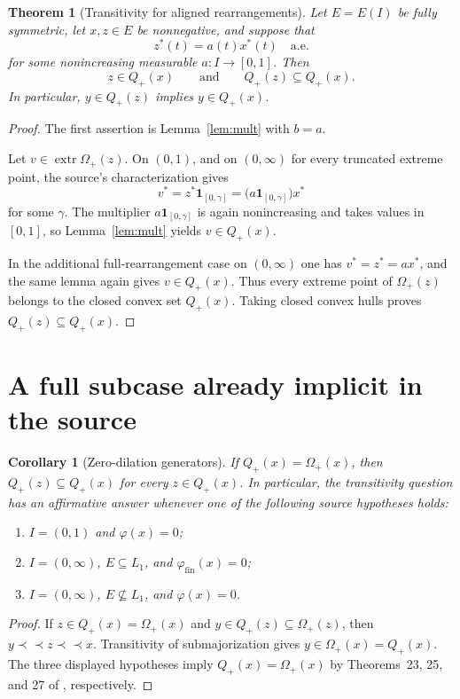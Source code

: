 \documentclass[11pt]{article}
\newtheorem{theorem}{Theorem}
\newtheorem{corollary}{Corollary}
\newcommand{\Qp}{Q_{+}}
\newcommand{\Op}{\Omega_{+}}
\newcommand{\extr}{\operatorname{extr}}
\begin{document}
\begin{theorem}[Transitivity for aligned rearrangements]\label{thm:main}
Let $E=E(I)$ be fully symmetric, let $x,z\in E$ be nonnegative, and suppose
that
\[
                 z^*(t)=a(t)x^*(t)\quad\text{a.e.}
\]
for some nonincreasing measurable $a:I\to[0,1]$.  Then
\[
                 z\in\Qp(x)
                 \qquad\text{and}\qquad
                 \Qp(z)\subseteq\Qp(x).
\]
In particular, $y\in\Qp(z)$ implies $y\in\Qp(x)$.
\end{theorem}

\begin{proof}
The first assertion is Lemma~\ref{lem:mult} with $b=a$.

Let $v\in\extr\Op(z)$.  On $(0,1)$, and on $(0,\infty)$ for every truncated
extreme point, the source's characterization gives
\[
 v^*=z^*\mathbf 1_{[0,\gamma]}
     =\bigl(a\mathbf 1_{[0,\gamma]}\bigr)x^*
\]
for some $\gamma$.  The multiplier
$a\mathbf 1_{[0,\gamma]}$ is again nonincreasing and takes values in
$[0,1]$, so Lemma~\ref{lem:mult} yields $v\in\Qp(x)$.

In the additional full-rearrangement case on $(0,\infty)$ one has
$v^*=z^*=a x^*$, and the same lemma again gives $v\in\Qp(x)$.
Thus every extreme point of $\Op(z)$ belongs to the closed convex set
$\Qp(x)$.  Taking closed convex hulls proves
$\Qp(z)\subseteq\Qp(x)$.
\end{proof}

\section{A full subcase already implicit in the source}

\begin{corollary}[Zero-dilation generators]\label{cor:zero}
If $\Qp(x)=\Op(x)$, then $\Qp(z)\subseteq\Qp(x)$ for every
$z\in\Qp(x)$.
In particular, the transitivity question has an affirmative answer whenever
one of the following source hypotheses holds:
\begin{enumerate}[label=(\roman*)]
\item $I=(0,1)$ and $\varphi(x)=0$;
\item $I=(0,\infty)$, $E\subseteq L_1$, and $\varphi_{\mathrm{fin}}(x)=0$;
\item $I=(0,\infty)$, $E\not\subseteq L_1$, and $\varphi(x)=0$.
\end{enumerate}
\end{corollary}

\begin{proof}
If $z\in\Qp(x)=\Op(x)$ and $y\in\Qp(z)\subseteq\Op(z)$, then
$y\prec\!\prec z\prec\!\prec x$.  Transitivity of submajorization gives
$y\in\Op(x)=\Qp(x)$.  The three displayed hypotheses imply
$\Qp(x)=\Op(x)$ by Theorems~23, 25, and 27 of \cite{SZ}, respectively.
\end{proof}
\end{document}
